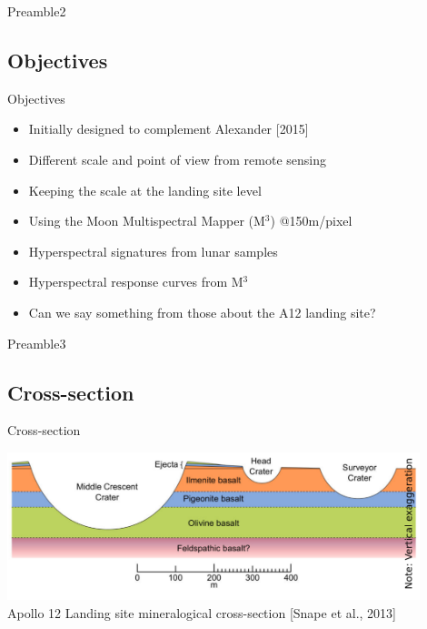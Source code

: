\documentclass[unknownkeysallowed,xcolor=dvipsnames,beamer]{beamer} %
\begin{document}
\begin{frame}[fragile]{Preamble2}
\subsection{Objectives}
\begin{block}{Objectives}
\begin{itemize}
\item Initially designed to complement Alexander [2015]
\item Different scale and point of view from remote sensing
\item Keeping the scale at the landing site level
\item Using the Moon Multispectral Mapper (M$^3$) @150m/pixel
\end{itemize}
\end{block}
\begin{block}{}
\begin{itemize}
\item Hyperspectral signatures from lunar samples
\item Hyperspectral response curves from M$^3$
\item Can we say something from those about the A12 landing site?
\end{itemize}
\end{block}
\end{frame}
\begin{frame}[fragile]{Preamble3}
\subsection{Cross-section}
\begin{block}{Cross-section}
\begin{center}
  \includegraphics[width=12cm]{images/fig2}\\
  Apollo 12 Landing site mineralogical cross-section [Snape et al., 2013]
\end{center}
\end{block}
\end{frame}
\end{document}
